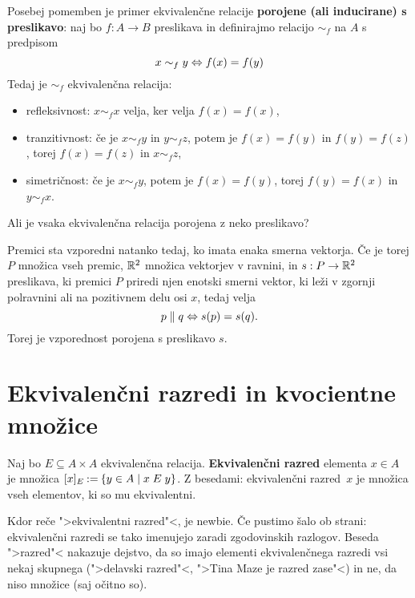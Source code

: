 Posebej pomemben je primer ekvivalenčne relacije \textbf{porojene (ali inducirane) s preslikavo}:
naj bo $f : A \to B$ preslikava in definirajmo relacijo $\sim_f$ na $A$ s predpisom
%
\begin{equation*}
  x \sim_f y \Leftrightarrow f(x) = f(y)
\end{equation*}
%
Tedaj je $\sim_f$ ekvivalenčna relacija:
%
\begin{itemize}
\item refleksivnost: $x \sim_f x$ velja, ker velja $f(x) = f(x)$,
\item tranzitivnost: če je $x \sim_f y$ in $y \sim_f z$, potem je $f(x) = f(y)$ in $f(y) = f(z)$, torej $f(x) = f(z)$ in $x \sim_f z$,
\item simetričnost: če je $x \sim_f y$, potem je $f(x) = f(y)$, torej $f(y) = f(x)$ in $y \sim_f x$.
\end{itemize}
%
Ali je vsaka ekvivalenčna relacija porojena z neko preslikavo?

\begin{zgled}
  Premici sta vzporedni natanko tedaj, ko imata enaka smerna vektorja. Če je
  torej $P$ množica vseh premic, $\mathbb{R}^2$ množica vektorjev v ravnini, in $s : P \to \mathbb{R}^2$
  preslikava, ki premici $P$ priredi njen enotski smerni vektor, ki leži v zgornji polravnini ali
  na pozitivnem delu osi $x$, tedaj velja
  \begin{equation*}
    p \parallel q \Leftrightarrow s(p) = s(q).
  \end{equation*}
  Torej je vzporednost porojena s preslikavo $s$.
\end{zgled}

\section{Ekvivalenčni razredi in kvocientne množice}

\begin{definicija}
  Naj bo $E \subseteq A \times A$ ekvivalenčna relacija. \textbf{Ekvivalenčni razred} elementa $x \in A$ je množica
  $[x]_E \mathbin{{:}{=}} \left\{ y \in A \; \middle| \; x \mathrel{E} y \right\}$. Z besedami: ekvivalenčni razred~$x$ je množica vseh elementov, ki so mu
  ekvivalentni.
\end{definicija}

\begin{opomba}
  Kdor reče ">ekvivalentni razred"<, je newbie.
  Če pustimo šalo ob strani: ekvivalenčni razredi se tako imenujejo zaradi zgodovinskih razlogov. Beseda ">razred"< nakazuje dejstvo, da so imajo elementi ekvivalenčnega razredi vsi nekaj skupnega (">delavski razred"<, ">Tina Maze je razred zase"<) in ne, da niso množice (saj očitno so).
\end{opomba}

